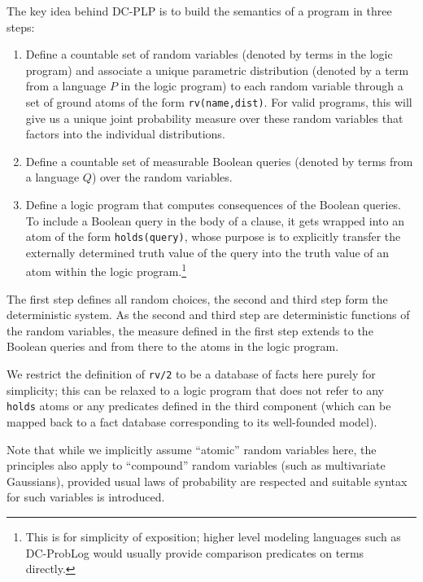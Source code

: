 The key idea behind DC-PLP is to build the semantics of a program in three steps:
\begin{enumerate}
\item Define a countable set of random variables (denoted by terms in the logic program) and associate a unique parametric distribution (denoted by a term from a language $P$ in the logic program) to each random variable through a set of ground atoms of the form \verb|rv(name,dist)|. For valid programs, this will give us a 
unique joint probability measure over these random variables that factors into the individual distributions.
\item Define a countable set of measurable Boolean queries (denoted by terms from a language $Q$) over the random variables.
\item Define a logic program that computes consequences of the Boolean queries. To include a  Boolean query in the body of a clause, it gets wrapped into an atom of the form \verb|holds(query)|, whose purpose is to explicitly transfer the externally determined truth value of the query into the truth value of an atom within the logic program.\footnote{This is for simplicity of exposition; higher level modeling languages such as DC-ProbLog would usually provide comparison predicates on terms directly.}
\end{enumerate}
The first step defines all random choices, the second and third step form the deterministic system. 
As the second and third step are deterministic functions of the random variables, the measure defined in the first step extends to the Boolean queries and from there to the atoms in the logic program.

We restrict the definition of \verb|rv/2| to be a database of facts here purely for simplicity; this can be relaxed to a logic program that does not refer to any \verb|holds| atoms or any predicates defined in the third component (which can be mapped back to a fact database corresponding to its well-founded model).


Note  that while we implicitly assume  ``atomic'' random variables here, the principles also apply to ``compound'' random variables (such as multivariate Gaussians), provided usual laws of probability are respected and suitable syntax for such variables is introduced.

